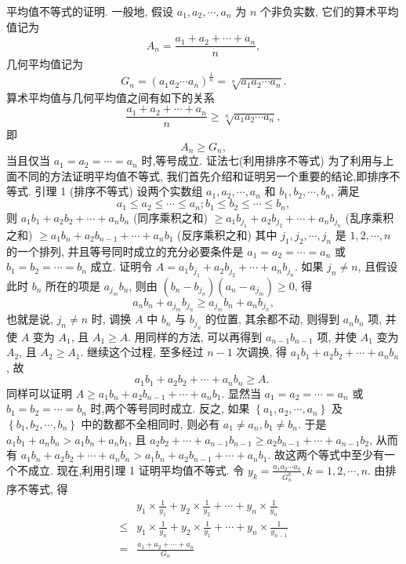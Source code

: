 平均值不等式的证明.
一般地, 假设 $a_1, a_2, \cdots, a_n$ 为 $n$ 个非负实数, 它们的算术平均值记为
$$
A_n=\frac{a_1+a_2+\cdots+a_n}{n},
$$
几何平均值记为
$$
G_n=\left(a_1 a_2 \cdots a_n\right)^{\frac{1}{n}}=\sqrt[n]{a_1 a_2 \cdots a_n} .
$$
算术平均值与几何平均值之间有如下的关系
$$
\frac{a_1+a_2+\cdots+a_n}{n} \geqslant \sqrt[n]{a_1 a_2 \cdots a_n},
$$
即
$$
A_n \geqslant G_n,
$$
当且仅当 $a_1=a_2=\cdots=a_n$ 时,等号成立.
证法七(利用排序不等式)
为了利用与上面不同的方法证明平均值不等式, 我们首先介绍和证明另一个重要的结论,即排序不等式.
引理 1 (排序不等式) 设两个实数组 $a_1, a_2, \cdots, a_n$ 和 $b_1, b_2, \cdots, b_n$, 满足
$$
a_1 \leqslant a_2 \leqslant \cdots \leqslant a_n ; b_1 \leqslant b_2 \leqslant \cdots \leqslant b_n,
$$
则
$a_1 b_1+a_2 b_2+\cdots+a_n b_n$ (同序乘积之和)
$\geqslant a_1 b_{j_1}+a_2 b_{j_2}+\cdots+a_n b_{j_n}$ (乱序乘积之和)
$\geqslant a_1 b_n+a_2 b_{n-1}+\cdots+a_n b_1$ (反序乘积之和)
其中 $j_1, j_2, \cdots, j_n$ 是 $1,2, \cdots, n$ 的一个排列, 并且等号同时成立的充分必要条件是 $a_1=a_2=\cdots=a_n$ 或 $b_1=b_2=\cdots=b_n$ 成立.
证明令 $A=a_1 b_{j_1}+a_2 b_{j_2}+\cdots+a_n b_{j_n}$. 如果 $j_n \neq n$, 且假设此时 $b_n$ 所在的项是 $a_{j_m} b_n$, 则由 $\left(b_n-b_{j_n}\right)\left(a_n-a_{j_m}\right) \geqslant 0$, 得
$$
a_n b_n+a_{j_m} b_{j_n} \geqslant a_{j_m} b_n+a_n b_{j_n},
$$
也就是说, $j_n \neq n$ 时, 调换 $A$ 中 $b_n$ 与 $b_{j_n}$ 的位置, 其余都不动, 则得到 $a_n b_n$ 项, 并使 $A$ 变为 $A_1$, 且 $A_1 \geqslant A$. 用同样的方法, 可以再得到 $a_{n-1} b_{n-1}$ 项, 并使 $A_1$ 变为 $A_2$, 且 $A_2 \geqslant A_1$.
继续这个过程, 至多经过 $n-1$ 次调换, 得 $a_1 b_1+a_2 b_2+\cdots+a_n b_n$, 故
$$
a_1 b_1+a_2 b_2+\cdots+a_n b_n \geqslant A \text {. }
$$
同样可以证明 $A \geqslant a_1 b_n+a_2 b_{n-1}+\cdots+a_n b_1$.
显然当 $a_1=a_2=\cdots=a_n$ 或 $b_1=b_2=\cdots=b_n$ 时,两个等号同时成立.
反之, 如果 $\left\{a_1, a_2, \cdots, a_n\right\}$ 及 $\left\{b_1, b_2, \cdots, b_n\right\}$ 中的数都不全相同时, 则必有 $a_1 \neq a_n, b_1 \neq b_n$. 于是 $a_1 b_1+a_n b_n>a_1 b_n+a_n b_1$, 且 $a_2 b_2+\cdots+a_{n-1} b_{n-1} \geqslant a_2 b_{n-1}+\cdots+a_{n-1} b_2$, 从而有 $a_1 b_n+a_2 b_2+\cdots+a_n b_n>a_1 b_n+a_2 b_{n-1}+\cdots+ a_n b_1$. 故这两个等式中至少有一个不成立.
现在,利用引理 1 证明平均值不等式.
令 $y_k=\frac{a_1 a_2 \cdots a_k}{G_n^k}, k=1,2, \cdots, n$. 由排序不等式, 得
$$
\begin{aligned}
& y_1 \times \frac{1}{y_1}+y_2 \times \frac{1}{y_2}+\cdots+y_n \times \frac{1}{y_n} \\
\leqslant & y_1 \times \frac{1}{y_n}+y_2 \times \frac{1}{y_1}+\cdots+y_n \times \frac{1}{y_{n-1}} \\
= & \frac{a_1+a_2+\cdots+a_n}{G_n}
\end{aligned}
$$
